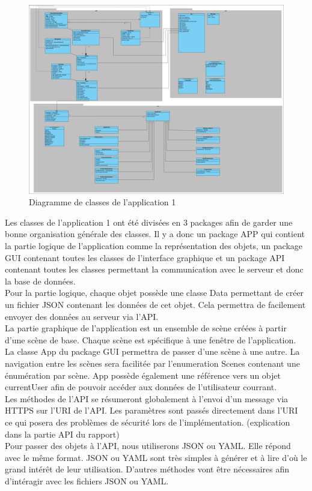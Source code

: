 \documentclass[../rapport.tex]{subfiles}
\begin{document}
\begin{figure}[h]
		\centering\includegraphics[scale=0.15]{ressources/photos_diagrammes/app1/classe1.jpg}
		\caption{Diagramme de classes de l'application 1 }
\end{figure}
Les classes de l'application 1 ont été divisées en 3 packages afin de garder une bonne organisation générale des classes.
Il y a donc un package APP qui contient la partie logique de l'application comme la représentation des objets, un package GUI contenant toutes les classes de l'interface graphique et un package API contenant toutes les classes permettant la communication avec le serveur et donc la base de données.\\

Pour la partie logique, chaque objet possède une classe Data permettant de créer un fichier JSON contenant les données de cet objet. Cela permettra de facilement envoyer des données au serveur via l'API.\\

La partie graphique de l'application est un ensemble de scène créées à partir d'une scène de base. Chaque scène est spécifique à une fenêtre de l'application.\\
La classe App du package GUI permettra de passer d'une scène à une autre. La navigation entre les scènes sera facilitée par l'enumeration Scenes contenant une énumération par scène. App possède également une référence vers un objet currentUser afin de pouvoir accéder aux données de l'utilisateur courrant.\\

Les méthodes de l'API se résumeront globalement à l'envoi d'un message via HTTPS sur l'URI de l'API. Les paramètres sont passés directement dans l'URI ce qui posera des problèmes de sécurité lors de l'implémentation. (explication dans la partie API du rapport) \\
Pour passer des objets à l'API, nous utiliserons JSON ou YAML. Elle répond avec le même format. JSON ou YAML sont très simples à générer et à lire d'où le grand intérêt de leur utilisation. D'autres méthodes vont être nécessaires afin d'intéragir avec les fichiers JSON ou YAML.
\end{document}
